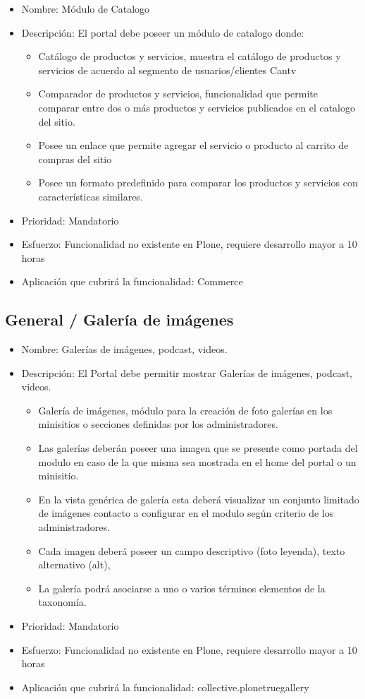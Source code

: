\documentclass[11pt, letterpaper, oneside, spanish]{scrbook}
\begin{document}
\begin{itemize}
\item Nombre: Módulo de Catalogo
\item Descripción: El portal debe poseer un módulo de catalogo donde:
\begin{itemize}
\item Catálogo de productos y servicios, muestra el catálogo de productos y
    servicios de acuerdo al segmento de usuarios/clientes Cantv
\item Comparador de productos y servicios, funcionalidad que permite comparar
    entre dos o más productos y servicios publicados en el catalogo del sitio.
\item Posee un enlace que permite agregar el servicio o producto al carrito de
    compras del sitio
\item Posee un formato predefinido para comparar los productos y servicios con
    características similares.
\end{itemize}
\item Prioridad: Mandatorio
\item Esfuerzo: Funcionalidad no existente en Plone, requiere desarrollo mayor a
  10 horas
\item Aplicación que cubrirá la funcionalidad: Commerce
\end{itemize}
\subsection{General / Galería de imágenes}
\label{sec-2-1-23}

\begin{itemize}
\item Nombre: Galerías de imágenes, podcast, videos.
\item Descripción: El Portal debe permitir mostrar Galerías de imágenes, podcast,
  videos.
\begin{itemize}
\item Galería de imágenes, módulo para la creación de foto galerías en los
    minisitios o secciones definidas por los administradores.
\item Las galerías deberán poseer una imagen que se presente como portada del
    modulo en caso de la que misma sea mostrada en el home del portal o un
    minisitio.
\item En la vista genérica de galería esta deberá visualizar un conjunto
    limitado de imágenes contacto a configurar en el modulo según criterio de
    los administradores.
\item Cada imagen deberá poseer un campo descriptivo (foto leyenda), texto
    alternativo (alt),
\item La galería podrá asociarse a uno o varios términos elementos de la
    taxonomía.
\end{itemize}
\item Prioridad: Mandatorio
\item Esfuerzo: Funcionalidad no existente en Plone, requiere desarrollo mayor a
  10 horas
\item Aplicación que cubrirá la funcionalidad: collective.plonetruegallery
\end{itemize}
\end{document}
